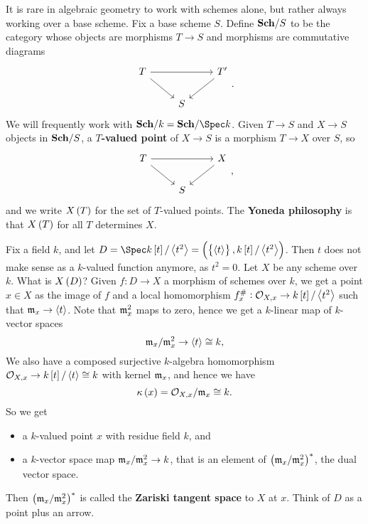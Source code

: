 \begin{remark*}
It is rare in algebraic geometry to work with schemes alone, but rather always working over a base scheme. Fix a base scheme $ S $. Define $ \textbf{Sch} / S $ to be the category whose objects are morphisms $ T \to S $ and morphisms are commutative diagrams
$$
\begin{tikzcd}
T \arrow{rr} \arrow{dr} & & T' \arrow{dl} \\
& S &
\end{tikzcd}.
$$
We will frequently work with $ \Sch / k = \Sch / \Spec k $. Given $ T \to S $ and $ X \to S $ objects in $ \textbf{Sch} / S $, a \textbf{$ T $-valued point} of $ X \to S $ is a morphism $ T \to X $ over $ S $, so
$$
\begin{tikzcd}
T \arrow{rr} \arrow{dr} & & X \arrow{dl} \\
& S &
\end{tikzcd},
$$
and we write $ X\br{T} $ for the set of $ T $-valued points. The \textbf{Yoneda philosophy} is that $ X\br{T} $ for all $ T $ determines $ X $.
\end{remark*}

\pagebreak

\begin{example*}
Fix a field $ k $, and let $ D = \Spec k\sbr{t} / \abr{t^2} = \br{\cbr{\abr{t}}, k\sbr{t} / \abr{t^2}} $. Then $ t $ does not make sense as a $ k $-valued function anymore, as $ t^2 = 0 $. Let $ X $ be any scheme over $ k $. What is $ X\br{D} $? Given $ f : D \to X $ a morphism of schemes over $ k $, we get a point $ x \in X $ as the image of $ f $ and a local homomorphism $ f_x^\# : \OOO_{X, x} \to k\sbr{t} / \abr{t^2} $ such that $ \mathfrak{m}_x \to \left\langle t \right\rangle $. Note that $ \mathfrak{m}_x^2 $ maps to zero, hence we get a $ k $-linear map of $ k $-vector spaces
$$ \mathfrak{m}_x / \mathfrak{m}_x^2 \to \left\langle t \right\rangle \cong k, $$
We also have a composed surjective $ k $-algebra homomorphism $ \OOO_{X, x} \to k\sbr{t} / \abr{t} \cong k $ with kernel $ \mathfrak{m}_x $, and hence we have
$$ \kappa\br{x} = \OOO_{X, x} / \mmm_x \cong k. $$
So we get
\begin{itemize}
\item a $ k $-valued point $ x $ with residue field $ k $, and
\item a $ k $-vector space map $ \mathfrak{m}_x / \mathfrak{m}_x^2 \to k $, that is an element of $ \br{\mmm_x / \mmm_x^2}^* $, the dual vector space.
\end{itemize}
Then $ \br{\mmm_x / \mmm_x^2}^* $ is called the \textbf{Zariski tangent space} to $ X $ at $ x $. Think of $ D $ as a point plus an arrow.
\end{example*}

